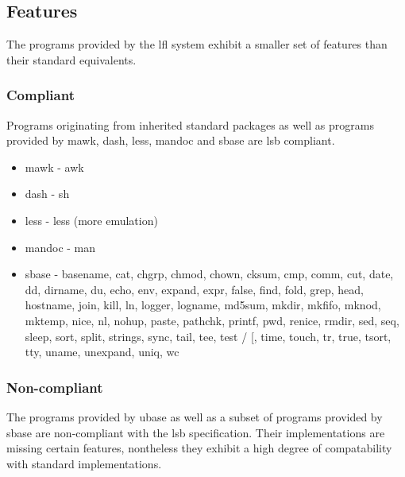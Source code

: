 \subsection{Features}\label{Features}

The programs provided by the \gls{lfl} system exhibit a smaller set of features than their standard equivalents.

\subsubsection{Compliant}

Programs originating from inherited standard packages as well as programs provided by mawk, dash, less, mandoc and sbase are \gls{lsb} compliant.

\begin{itemize}
    \item mawk - awk
    \item dash - sh
    \item less - less (more emulation)
    \item mandoc - man
    \item sbase - basename, cat, chgrp, chmod, chown, cksum, cmp, comm, cut, date, dd, dirname, du, echo, env, expand, expr, false, find, fold, grep, head, hostname, join, kill, ln, logger, logname, md5sum, mkdir, mkfifo, mknod, mktemp, nice, nl, nohup, paste, pathchk, printf, pwd, renice, rmdir, sed, seq, sleep, sort, split, strings, sync, tail, tee, test / [, time, touch, tr, true, tsort, tty, uname, unexpand, uniq, wc
\end{itemize}

\subsubsection{Non-compliant}

The programs provided by ubase as well as a subset of programs provided by sbase are non-compliant with the \gls{lsb} specification. Their implementations are missing certain features, nontheless they exhibit a high degree of compatability with standard implementations.


